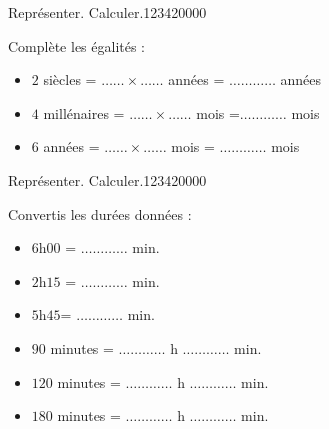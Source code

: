 \begin{pageParcoursu}

\begin{ExoCu}{Représenter. Calculer.}{1234}{2}{0}{0}{0}{0}

 Complète les égalités :\vspace{0.2cm}
 \begin{itemize}
 \item $2$ siècles =  $\ldots\ldots \times \ldots \ldots $ années = $\ldots \ldots \ldots\ldots$ années \vspace{0.2cm}
 \item $4$ millénaires = $\ldots \ldots\times \ldots \ldots $ mois =$\ldots \ldots\ldots\ldots $ mois \vspace{0.2cm}
 \item $6$ années = $\ldots\ldots \times \ldots \ldots $ mois = $\ldots \ldots\ldots\ldots$ mois \vspace{0.2cm}
 \end{itemize}
\end{ExoCu}

\begin{ExoCu}{Représenter. Calculer.}{1234}{2}{0}{0}{0}{0}

Convertis les durées données :\vspace{0.2cm}

\begin{minipage}{0.50\linewidth}
 \begin{itemize}
 \item $6$h$00$ =  $\ldots \ldots\ldots\ldots $ min.  \vspace{0.2cm}
 \item $2$h$15$ =  $\ldots \ldots\ldots\ldots $ min. \vspace{0.2cm}
 \item $5$h$45$=  $\ldots \ldots\ldots\ldots $ min. \vspace{0.2cm}
 \end{itemize}
\end{minipage}
\begin{minipage}{0.50\linewidth}
 \begin{itemize}
 \item $90$ minutes  =  $\ldots \ldots \ldots \ldots $ h $\ldots \ldots \ldots \ldots $ min. \vspace{0.2cm}
 \item $120$ minutes = $\ldots \ldots \ldots \ldots $ h $\ldots \ldots \ldots \ldots $ min. \vspace{0.2cm}
 \item $180$ minutes = $\ldots \ldots \ldots \ldots $ h $\ldots \ldots \ldots \ldots $ min. \vspace{0.2cm}
 \end{itemize}
\end{minipage}


\end{ExoCu}
\end{pageParcoursu}
